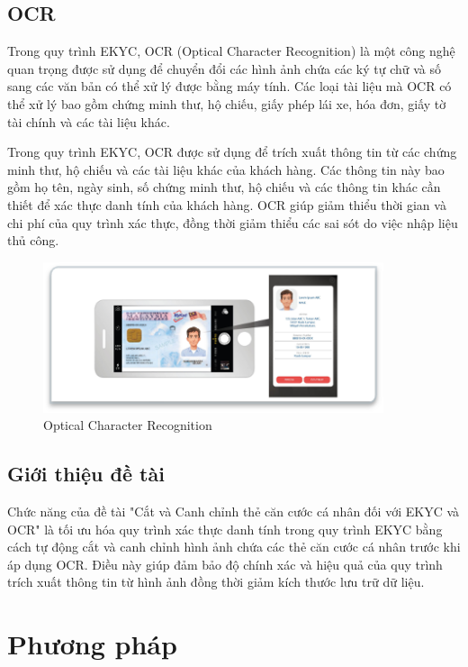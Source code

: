 \documentclass [10pt, fancyhdr, twoside] {article}
\begin{document}
\subsection{OCR}
Trong quy trình EKYC, OCR (Optical Character Recognition) là một công nghệ quan trọng được sử dụng để chuyển đổi các hình ảnh chứa các ký tự chữ và số sang các văn bản có thể xử lý được bằng máy tính. Các loại tài liệu mà OCR có thể xử lý bao gồm chứng minh thư, hộ chiếu, giấy phép lái xe, hóa đơn, giấy tờ tài chính và các tài liệu khác.

Trong quy trình EKYC, OCR được sử dụng để trích xuất thông tin từ các chứng minh thư, hộ chiếu và các tài liệu khác của khách hàng. Các thông tin này bao gồm họ tên, ngày sinh, số chứng minh thư, hộ chiếu và các thông tin khác cần thiết để xác thực danh tính của khách hàng. OCR giúp giảm thiểu thời gian và chi phí của quy trình xác thực, đồng thời giảm thiểu các sai sót do việc nhập liệu thủ công.

\begin{figure}[h]
    \caption{Optical Character Recognition}
    \centering
    \includegraphics[width=10cm]{Picture2.png}
\end{figure}

\subsection{Giới thiệu đề tài}
Chức năng của đề tài "Cắt và Canh chỉnh thẻ căn cước cá nhân đối với EKYC và OCR" là tối ưu hóa quy trình xác thực danh tính trong quy trình EKYC bằng cách tự động cắt và canh chỉnh hình ảnh chứa các thẻ căn cước cá nhân trước khi áp dụng OCR. Điều này giúp đảm bảo độ chính xác và hiệu quả của quy trình trích xuất thông tin từ hình ảnh đồng thời giảm kích thước lưu trữ dữ liệu.

\section{Phương pháp}
\end{document}
